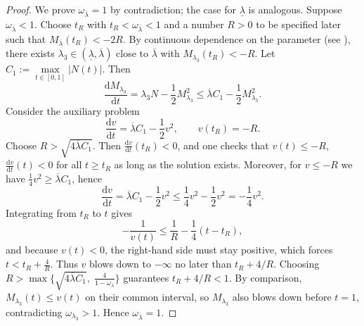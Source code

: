 \documentclass{amsart}
\begin{document}
\begin{proof}
We prove $\omega_{\overline{\lambda}}=1$ by contradiction; the case for $\underline{\lambda}$ is analogous.
Suppose $\omega_{\overline{\lambda}}<1$. Choose $t_{R}$ with $t_{R}<\omega_{\overline{\lambda}}<1$ and a number $R>0$ to be specified later such that $M_{\overline{\lambda}}(t_{R})<-2R$.
By continuous dependence on the parameter (see \cite[Chapter~V, Theorem~2.1]{Hartman02}), there exists $\lambda_{3}\in(\underline{\lambda},\overline{\lambda})$ close to $\overline{\lambda}$ with $M_{\lambda_{3}}(t_{R}) < -R$.
Let $C_{1} := \max\limits_{t\in[0,1]}|N(t)|$. Then
\[
\frac{\mathrm{d}M_{\lambda_{3}}}{\mathrm{d}t} = \lambda_{3} N - \frac12 M_{\lambda_{3}}^{2} \le \overline{\lambda} C_{1} - \frac12 M_{\lambda_{3}}^{2}.
\]
Consider the auxiliary problem
\[
\frac{\mathrm{d}v}{\mathrm{d}t} = \overline{\lambda} C_{1} - \frac12 v^{2},\qquad v(t_{R}) = -R.
\]
Choose $R > \sqrt{4\overline{\lambda} C_{1}}$. Then $\frac{\mathrm{d}v}{\mathrm{d}t}(t_{R})<0$, and one checks that $v(t)\le -R$, $\frac{\mathrm{d}v}{\mathrm{d}t}(t)<0$ for all $t\ge t_{R}$ as long as the solution exists.
Moreover, for $v\le -R$ we have $\frac14 v^{2} \ge \overline{\lambda} C_{1}$, hence
\[
\frac{\mathrm{d}v}{\mathrm{d}t} = \overline{\lambda} C_{1} - \frac12 v^{2} \le \frac14 v^{2} - \frac12 v^{2} = -\frac14 v^{2}.
\]
Integrating from $t_{R}$ to $t$ gives
\[
-\frac{1}{v(t)} \le \frac{1}{R} - \frac14 (t - t_{R}),
\]
and because $v(t)<0$, the right-hand side must stay positive, which forces
$t < t_{R} + \frac{4}{R}$.
Thus $v$ blows down to $-\infty$ no later than $t_{R} + 4/R$.
Choosing $R > \max\bigl\{ \sqrt{4\overline{\lambda} C_{1}},\; \frac{4}{1-\omega_{\overline{\lambda}}} \bigr\}$ guarantees $t_{R} + 4/R < 1$.
By comparison, $M_{\lambda_{3}}(t)\le v(t)$ on their common interval, so $M_{\lambda_{3}}$ also blows down before $t=1$, contradicting $\omega_{\lambda_{3}}>1$. Hence $\omega_{\overline{\lambda}}=1$.
\end{proof}
\end{document}
